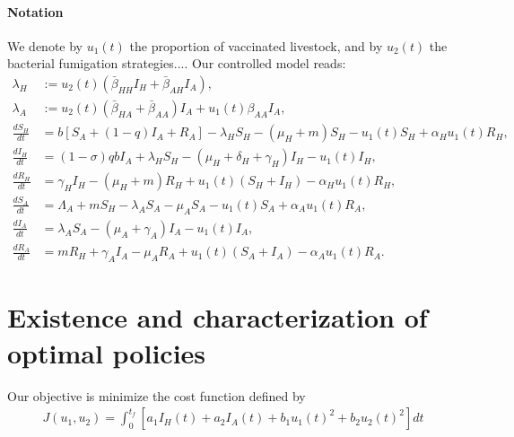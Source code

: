 \documentclass[11pt]{amsart}
\theoremstyle{definition}
\numberwithin{equation}{section}
\begin{document}
    \paragraph{Notation}
    We denote by $u_1(t)$ the proportion of vaccinated livestock,
    and by $u_2(t)$ the bacterial fumigation strategies....
    Our controlled model reads:
    \begin{equation}\label{controlled_system}
    \begin{aligned}
        \lambda_H &:= u_2(t) (\bar{\beta}_{HH} I_H + \bar{\beta}_{AH} I_A),
        \\
        \lambda_A &:= 
            u_2(t)(\bar{\beta}_{HA} + \bar{\beta}_{AA}) I_A
        + u_1(t)\beta_{AA} I_A,
        \\
        \frac{d S_H}{dt} &=
        b \left[S_A + (1 - q) I_A + R_A\right]
        -\lambda_H S_H - (\mu_H + m) S_H 
        - u_1(t)  S_H + \alpha_H u_1(t) R_H,
        \\
        \frac{d I_H}{dt} &=
        (1 - \sigma)  q  b  I_A
        + \lambda_H S_H - (\mu_H + \delta_H + \gamma_H)I_H
        - u_1(t) I_H,
        \\
        \frac{d R_H}{dt} &=
        \gamma_H I_H - (\mu_H + m) R_H
        + u_1(t) (S_H + I_H) - \alpha_H u_1(t) R_H,
        \\
        \frac{dS_A}{dt} &=
        \Lambda_A + m S_H - \lambda_A S_A - \mu_A S_A
        - u_1(t) S_A + \alpha_A u_1(t) R_A,
        \\
        \frac{d I_A}{dt} &=
        \lambda_A S_A - (\mu_A + \gamma_A)   I_A
        - u_1(t) I_A,
        \\
        \frac{dR_A}{dt} &=
        m R_H + \gamma_A I_A - \mu_A R_A
        + u_1(t) (S_A + I_A) - \alpha_A u_1(t) R_A.
    \end{aligned}
\end{equation}    
    

    \section{Existence and characterization of optimal policies}
    Our objective is minimize the cost function defined by
    \begin{equation}\label{cost_function}
        \begin{aligned}
        J(u_{1},u_{2}) = \int_{0}^{t_{f}}\left[a_{1}I_{H}(t) + a_{2}I_{A}(t) + b_{1}u_{1}(t)^2 + b_{2}u_{2}(t)^2\right]dt
        \end{aligned}
    \end{equation}
    
\end{document}
